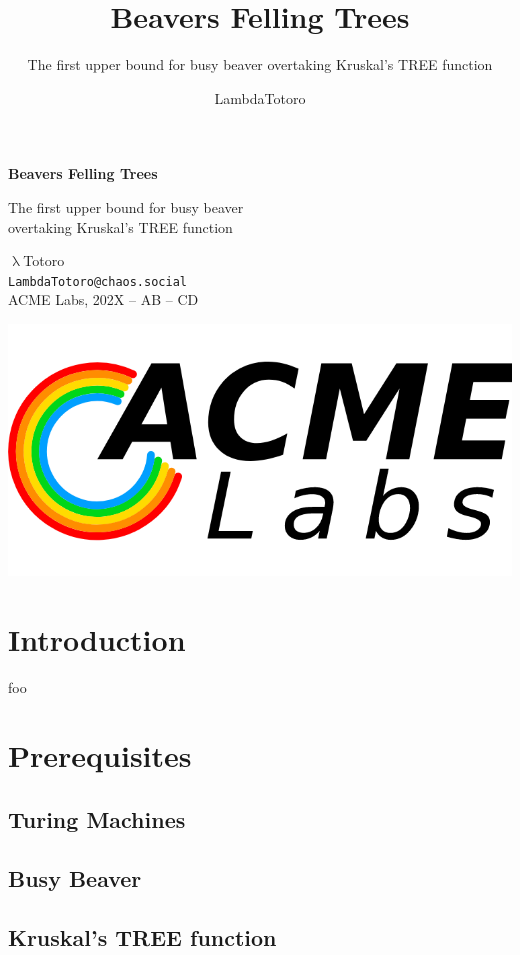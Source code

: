 \documentclass[aspectratio=169, usenames, dvipsnames]{beamer}
\author{LambdaTotoro}
\title{Beavers Felling Trees}
\subtitle{The first upper bound for busy beaver overtaking Kruskal's TREE function}
\begin{document}
\begin{frame}
\begin{center}
\huge \textbf{Beavers Felling Trees}\medskip

\large The first upper bound for busy beaver\\ overtaking Kruskal's TREE function 

\normalsize 
\bigskip\bigskip

\large $\uplambda$Totoro\\
\texttt{LambdaTotoro@chaos.social}\\
ACME Labs, 202X -- AB -- CD
\bigskip

\includegraphics[scale=0.125]{images/acme_logo}
\end{center}
\end{frame}

\section{Introduction}

\begin{frame}
foo
\end{frame}

\section{Prerequisites}

\subsection{Turing Machines}
\subsection{Busy Beaver}

\subsection{Kruskal's TREE function}
\end{document}
